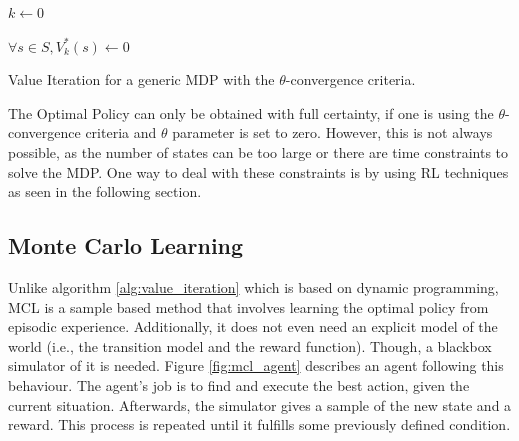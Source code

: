 \begin{algorithm}[H]
    \DontPrintSemicolon
    $ k \gets 0 $

    $ \forall s \in S, V_{k}^*(s) \gets 0$



\caption{Value Iteration for a generic \gls{MDP} with the $\theta$-convergence
criteria.}
\label{alg:value_iteration}
\end{algorithm}

\par

The Optimal Policy can only be obtained with full certainty, if one is using the
$\theta$-convergence criteria and $\theta$ parameter is set to zero. However,
this is not always possible, as the number of states can be too large or there
are time constraints to solve the \gls{MDP}. One way to deal with these
constraints is by using \gls{RL} techniques as seen in the following section.

\subsection{Monte Carlo Learning}

Unlike algorithm \ref{alg:value_iteration} which is based on dynamic programming,
\gls{MCL} \cite{Sutton1998} is a sample based method that involves learning the
optimal policy from episodic experience. Additionally, it does not even need an
explicit model of the world (i.e., the transition model and the reward
function). Though, a blackbox simulator of it is needed. Figure
\ref{fig:mcl_agent} describes an agent following this behaviour. The agent's job
is to find and execute the best action, given the current situation. Afterwards,
the simulator gives a sample of the new state and a reward. This process
is repeated until it fulfills some previously defined condition.


